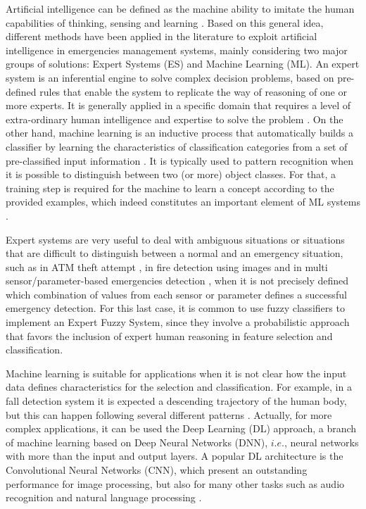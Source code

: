 \begin{refsection}
Artificial intelligence can be defined as the machine ability to imitate the human capabilities of thinking, sensing and learning \cite{ExpertFire2}. Based on this general idea, different methods have been applied in the literature to exploit artificial intelligence in emergencies management systems, mainly considering two major groups of solutions: Expert Systems (ES) and Machine Learning (ML). An expert system is an inferential engine to solve complex decision problems, based on pre-defined rules that enable the system to replicate the way of reasoning of one or more experts. It is generally applied in a specific domain that requires a level of extra-ordinary human intelligence and expertise to solve the problem \cite{ExpertFuzzy}. On the other hand, machine learning is an inductive process that automatically builds a classifier by learning the characteristics of classification categories from a set of pre-classified input information \cite{SocialMachineLearningSurvey}. It is typically used to pattern recognition when it is possible to distinguish between two (or more) object classes. For that, a training step is required for the machine to learn a concept according to the provided examples, which indeed constitutes an important element of ML systems \cite{machineIoT}.

Expert systems are very useful to deal with ambiguous situations or situations that are difficult to distinguish between a normal and an emergency situation, such as in ATM theft attempt \cite{machine1}, in fire detection using images \cite{ExpertFire1} and in multi sensor/parameter-based emergencies detection \cite{ExpertFire2,FuzzyWater1}, when it is not precisely defined which combination of values from each sensor or parameter defines a successful emergency detection. For this last case, it is common to use fuzzy classifiers to implement an Expert Fuzzy System, since they involve a probabilistic approach that favors the inclusion of expert human reasoning in feature selection and classification.

Machine learning is suitable for applications when it is not clear how the input data defines characteristics for the selection and classification. For example, in a fall detection system it is expected a descending trajectory of the human body, but this can happen following several different patterns \cite{cnn1,MachineVideoFall}. Actually, for more complex applications, it can be used the Deep Learning (DL) approach, a branch of machine learning based on Deep Neural Networks (DNN), $i.e.$, neural networks with more than the input and output layers. A popular DL architecture is the Convolutional Neural Networks (CNN), which present an outstanding performance for image processing, but also for many other tasks such as audio recognition and natural language processing \cite{cnn1,CNNFireVideo,MachineCovidVoice}. 


\end{refsection}

